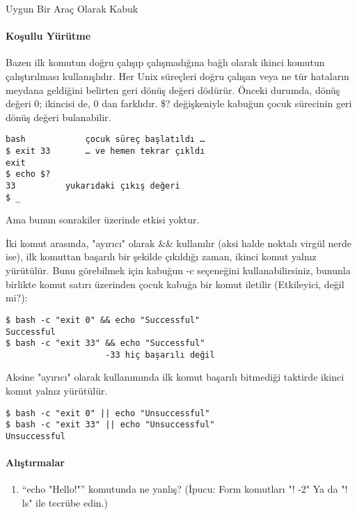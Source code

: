 \begin{section}{Uygun Bir Araç Olarak Kabuk}
\paragraph{Koşullu Yürütme}{Bazen ilk komutun doğru çalışıp çalışmadığına bağlı olarak ikinci komutun çalıştırılması kullanışlıdır. Her Unix süreçleri doğru çalışan veya ne tür hataların meydana geldiğini belirten geri dönüş değeri dödürür. Önceki durumda, dönüş değeri 0; ikincisi de, 0 dan farklıdır. \$? değişkeniyle kabuğun çocuk sürecinin geri dönüş değeri bulanabilir.
\begin{verbatim}
bash 			çocuk süreç başlatıldı …
$ exit 33 		… ve hemen tekrar çıkldı
exit
$ echo $?
33 			yukarıdaki çıkış değeri
$ _
\end{verbatim}

Ama bunun sonrakiler üzerinde etkisi yoktur.

İki komut arasında, "ayırıcı" olarak \&\& kullanılır (aksi halde noktalı virgül nerde ise), ilk komuttan başarılı bir şekilde çıkıldığı zaman, ikinci komut yalnız yürütülür. Bunu görebilmek için kabuğun -c seçeneğini kullanabilirsiniz, bununla birlikte komut satırı üzerinden çocuk kabuğa bir komut iletilir (Etkileyici, değil mi?):
\begin{verbatim}
$ bash -c "exit 0" && echo "Successful"
Successful
$ bash -c "exit 33" && echo "Successful"
 					-33 hiç başarılı değil
\end{verbatim}

Aksine "ayırıcı" olarak \textbar \textbar kullanımında ilk komut başarılı bitmediği taktirde ikinci komut yalnız yürütülür. 
\begin{verbatim}
$ bash -c "exit 0" || echo "Unsuccessful"
$ bash -c "exit 33" || echo "Unsuccessful"
Unsuccessful
\end{verbatim} }
\paragraph{{\Huge{\PencilLeftDown}}Alıştırmalar}{
\begin{enumerate}
\item “echo "Hello!"” komutunda ne yanlış? (İpucu: Form komutları "! -2" Ya da "! ls" ile tecrübe edin.)
\end{enumerate}
}
\end{section}
